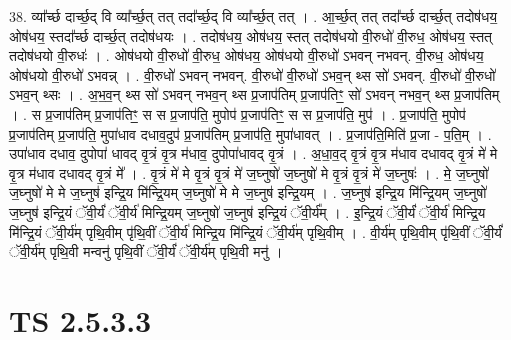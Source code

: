 \documentclass[17pt]{extarticle}
\begin{document}
38. व्या᳚र्च्छ दार्च्छ॒द् वि व्या᳚र्च्छ॒त् तत् तदा᳚र्च्छ॒द् वि व्या᳚र्च्छ॒त् तत् । . आ॒र्च्छ॒त् तत् तदा᳚र्च्छ दार्च्छ॒त् तदोष॑धय॒ ओष॑धय॒ स्तदा᳚र्च्छ दार्च्छ॒त् तदोष॑धयः । . तदोष॑धय॒ ओष॑धय॒ स्तत् तदोष॑धयो वी॒रुधो॑ वी॒रुध॒ ओष॑धय॒ स्तत् तदोष॑धयो वी॒रुधः॑ । . ओष॑धयो वी॒रुधो॑ वी॒रुध॒ ओष॑धय॒ ओष॑धयो वी॒रुधो॑ ऽभवन् नभवन्. वी॒रुध॒ ओष॑धय॒ ओष॑धयो वी॒रुधो॑ ऽभवन्न् । . वी॒रुधो॑ ऽभवन् नभवन्. वी॒रुधो॑ वी॒रुधो॑ ऽभव॒न् थ्स सो॑ ऽभवन्. वी॒रुधो॑ वी॒रुधो॑ ऽभव॒न् थ्सः । . अ॒भ॒व॒न् थ्स सो॑ ऽभवन् नभव॒न् थ्स प्र॒जाप॑तिम् प्र॒जाप॑तिꣳ॒॒ सो॑ ऽभवन् नभव॒न् थ्स प्र॒जाप॑तिम् । . स प्र॒जाप॑तिम् प्र॒जाप॑तिꣳ॒॒ स स प्र॒जाप॑ति॒ मुपोप॑ प्र॒जाप॑तिꣳ॒॒ स स प्र॒जाप॑ति॒ मुप॑ । . प्र॒जाप॑ति॒ मुपोप॑ प्र॒जाप॑तिम् प्र॒जाप॑ति॒ मुपा॑धाव दधाव॒दुप॑ प्र॒जाप॑तिम् प्र॒जाप॑ति॒ मुपा॑धावत् । . प्र॒जाप॑ति॒मिति॑ प्र॒जा - प॒ति॒म् । . उपा॑धाव दधाव॒ दुपोपा॑ धावद् वृ॒त्रं वृ॒त्र म॑धाव॒ दुपोपा॑धावद् वृ॒त्रं । . अ॒धा॒व॒द् वृ॒त्रं वृ॒त्र म॑धाव दधावद् वृ॒त्रं मे॑ मे वृ॒त्र म॑धाव दधावद् वृ॒त्रं मे᳚ । . वृ॒त्रं मे॑ मे वृ॒त्रं वृ॒त्रं मे॑ ज॒घ्नुषो॑ ज॒घ्नुषो॑ मे वृ॒त्रं वृ॒त्रं मे॑ ज॒घ्नुषः॑ । . मे॒ ज॒घ्नुषो॑ ज॒घ्नुषो॑ मे मे ज॒घ्नुष॑ इन्द्रि॒य मि॑न्द्रि॒यम् ज॒घ्नुषो॑ मे मे ज॒घ्नुष॑ इन्द्रि॒यम् । . ज॒घ्नुष॑ इन्द्रि॒य मि॑न्द्रि॒यम् ज॒घ्नुषो॑ ज॒घ्नुष॑ इन्द्रि॒यं ॅवी॒र्यं॑ ॅवी॒र्य॑ मिन्द्रि॒यम् ज॒घ्नुषो॑ ज॒घ्नुष॑ इन्द्रि॒यं ॅवी॒र्य᳚म् । . इ॒न्द्रि॒यं ॅवी॒र्यं॑ ॅवी॒र्य॑ मिन्द्रि॒य मि॑न्द्रि॒यं ॅवी॒र्य॑म् पृथि॒वीम् पृ॑थि॒वीं ॅवी॒र्य॑ मिन्द्रि॒य मि॑न्द्रि॒यं ॅवी॒र्य॑म् पृथि॒वीम् । . वी॒र्य॑म् पृथि॒वीम् पृ॑थि॒वीं ॅवी॒र्यं॑ ॅवी॒र्य॑म् पृथि॒वी मन्वनु॑ पृथि॒वीं ॅवी॒र्यं॑ ॅवी॒र्य॑म् पृथि॒वी मनु॑ । \newline
\pagebreak
{}

\section{ TS 2.5.3.3 }
\end{document}
